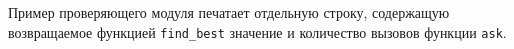 Пример проверяющего модуля печатает отдельную строку, содержащую возвращаемое
функцией \texttt{find\_best} значение и количество вызовов функции \texttt{ask}.
